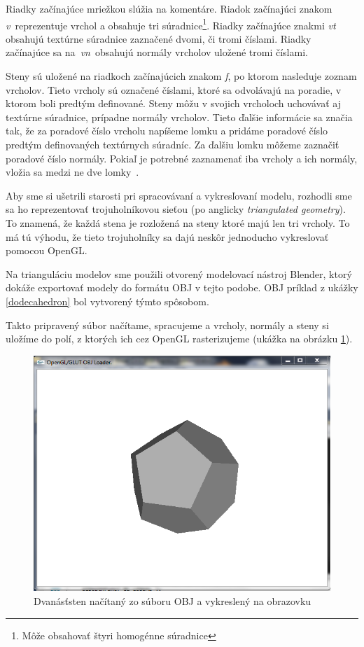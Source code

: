 Riadky začínajúce mriežkou slúžia na komentáre. Riadok začínajúci znakom \emph{v}~reprezentuje vrchol a obsahuje tri súradnice\footnote{Môže obsahovať štyri homogénne súradnice}. Riadky začínajúce znakmi \emph{vt} obsahujú textúrne súradnice zaznačené dvomi, či tromi číslami. Riadky začínajúce sa na~\emph{vn}~obsahujú normály vrcholov uložené tromi číslami.

Steny sú uložené na riadkoch začínajúcich znakom \emph{f}, po ktorom nasleduje zoznam vrcholov. Tieto vrcholy sú označené číslami, ktoré sa odvolávajú na poradie, v ktorom boli predtým definované. Steny môžu v svojich vrcholoch uchovávať aj textúrne súradnice, prípadne normály vrcholov. Tieto ďalšie informácie sa značia tak, že za poradové číslo vrcholu napíšeme lomku a pridáme poradové číslo predtým definovaných textúrnych súradníc. Za ďalšiu lomku môžeme zaznačiť poradové číslo normály. Pokiaľ je potrebné zaznamenať iba vrcholy a ich normály, vložia sa medzi ne dve lomky~\cite{Wavefront}.

Aby sme si ušetrili starosti pri spracovávaní a vykresľovaní modelu, rozhodli sme sa ho reprezentovať trojuholníkovou sieťou (po anglicky \emph{triangulated geometry}). To znamená, že každá stena je rozložená na steny ktoré majú len tri vrcholy. To má tú výhodu, že tieto trojuholníky sa dajú neskôr jednoducho vykreslovať pomocou OpenGL.

Na trianguláciu modelov sme použili otvorený modelovací nástroj Blender, ktorý dokáže exportovať modely do formátu OBJ v tejto podobe. OBJ príklad z ukážky \ref{dodecahedron} bol vytvorený týmto spôsobom.

Takto pripravený súbor načítame, spracujeme a vrcholy, normály a steny si uložíme do polí, z ktorých ich cez OpenGL rasterizujeme (ukážka na obrázku \ref{dodecahedron-render}).

\begin{figure}[h]
 \centering
 \includegraphics[max width=\textwidth]{pictures/screenshot-object-loader.png}
 \caption{Dvanásťsten načítaný zo súboru OBJ a vykreslený na obrazovku}
 \label{dodecahedron-render}
 \end{figure}

